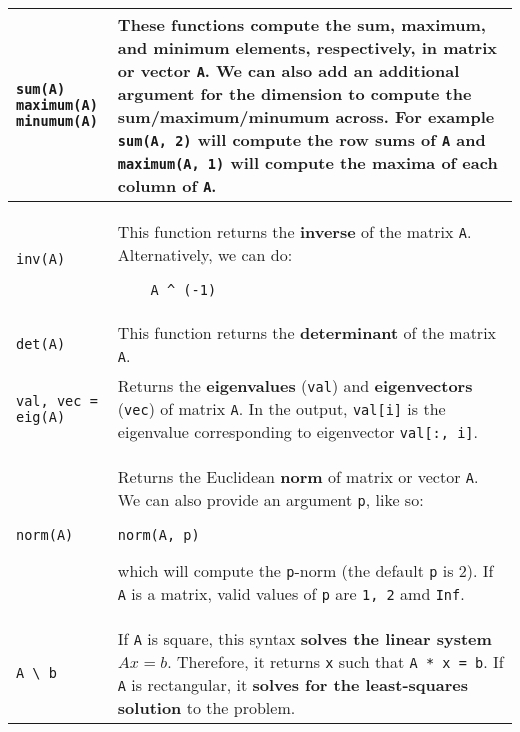 \documentclass[]{article}
\begin{document}
\begin{longtable}{ |m{6cm}  | m{11cm} |}
\begin{verbatim}
sum(A)
maximum(A)
minumum(A)
	\end{verbatim}
	& These functions compute the sum, maximum, and minimum elements,
    respectively, in matrix or vector \texttt{A}. We can also add an
    additional argument for the dimension to compute the sum/maximum/minumum
    across. For example \texttt{sum(A, 2)} will compute the row sums of
    \texttt{A} and \texttt{maximum(A, 1)} will compute the maxima of each
    column of \texttt{A}.
    \\\hline
    \begin{verbatim}
inv(A)
	\end{verbatim}
	& This function returns the \textbf{inverse} of the matrix
    \texttt{A}. Alternatively, we can do:
    \begin{verbatim}
    A ^ (-1)
    \end{verbatim}
    \\\hline
 \begin{verbatim}
det(A)
	\end{verbatim}
	& This function returns the \textbf{determinant} of the matrix
    \texttt{A}.     
    \\\hline
 \begin{verbatim}
val, vec = eig(A)
	\end{verbatim} 
&    Returns the \textbf{eigenvalues} (\texttt{val}) and \textbf{eigenvectors} (\texttt{vec}) of
    matrix \texttt{A}. In the output, \texttt{val[i]} is the eigenvalue
    corresponding to eigenvector \texttt{val[:, i]}.
    \\\hline
 \begin{verbatim}
norm(A)
	\end{verbatim} 
&    Returns the Euclidean \textbf{norm} of matrix or vector \texttt{A}.
We can also provide an argument \texttt{p}, like so:
\begin{verbatim}
norm(A, p)
\end{verbatim}
which will compute the \texttt{p}-norm (the default \texttt{p} is 2). If
\texttt{A} is a matrix, valid values of \texttt{p} are \texttt{1, 2} amd
\texttt{Inf}.
\\\hline
 \begin{verbatim}
A \ b
	\end{verbatim} 
&   If \texttt{A} is square, this syntax \textbf{solves the linear system} $Ax = b$.
Therefore, it returns \texttt{x} such that \texttt{A * x = b}.
If \texttt{A} is rectangular, it \textbf{solves for the least-squares
solution} to the
problem.
\\\hline
\end{longtable} 
\end{document}
